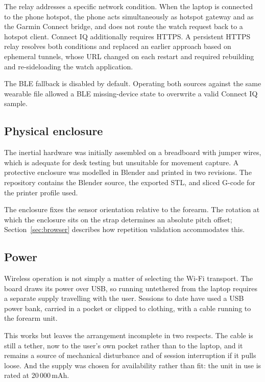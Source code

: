 \documentclass[11pt,a4paper]{article}
\begin{document}
The relay addresses a specific network condition. When the laptop is connected to
the phone hotspot, the phone acts simultaneously as hotspot gateway and as the
Garmin Connect bridge, and does not route the watch request back to a hotspot
client. Connect IQ additionally requires HTTPS. A persistent HTTPS relay resolves
both conditions and replaced an earlier approach based on ephemeral tunnels,
whose URL changed on each restart and required rebuilding and re-sideloading the
watch application.

The BLE fallback is disabled by default. Operating both sources against the same
wearable file allowed a BLE missing-device state to overwrite a valid Connect IQ
sample.

\subsection{Physical enclosure}

The inertial hardware was initially assembled on a breadboard with jumper wires,
which is adequate for desk testing but unsuitable for movement capture. A
protective enclosure was modelled in Blender and printed in two revisions. The
repository contains the Blender source, the exported STL, and sliced G-code for
the printer profile used.

The enclosure fixes the sensor orientation relative to the forearm. The rotation
at which the enclosure sits on the strap determines an absolute pitch offset;
Section~\ref{sec:browser} describes how repetition validation accommodates this.

\subsection{Power}
\label{sec:power}

Wireless operation is not simply a matter of selecting the Wi-Fi transport. The
board draws its power over USB, so running untethered from the laptop requires a
separate supply travelling with the user. Sessions to date have used a USB power
bank, carried in a pocket or clipped to clothing, with a cable running to the
forearm unit.

This works but leaves the arrangement incomplete in two respects. The cable is
still a tether, now to the user's own pocket rather than to the laptop, and it
remains a source of mechanical disturbance and of session interruption if it
pulls loose. And the supply was chosen for availability rather than fit: the
unit in use is rated at 20\,000\,mAh.
\end{document}
